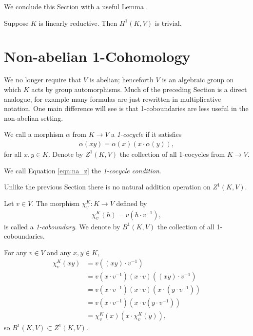 We conclude this Section with a useful Lemma \cite[Proposition 1]{kemper2000characterization}.
\begin{lemma} Suppose $K$ is linearly reductive. Then $H^1(K, V)$ is trivial.
  \label{lem:lin_red_h}
\end{lemma}

\section{Non-abelian 1-Cohomology}
	
We no longer require that $V$ is abelian; henceforth $V$ is an algebraic group on which $K$ acts by group automorphisms. Much of the preceding Section is a direct analogue, for example many formulas are just rewritten in multiplicative notation.
One main difference will see is that 1-coboundaries are less useful in the non-abelian setting.

\begin{definition} We call a morphism $\alpha$ from $K\rightarrow V$ a \emph{1-cocycle} if it satisfies
\begin{align}
  \alpha(xy) = \alpha(x) (x\cdot\alpha(y)),
  \label{eqn:na_z}
\end{align}
for all $x, y \in K$. Denote by $Z^1\left( K, V \right)$ the collection of all 1-cocycles from $K\rightarrow V$.

We call Equation \ref{eqn:na_z} the \emph{1-cocycle condition}.
\end{definition}

\begin{remark} Unlike the previous Section there is no natural addition operation on $Z^1(K, V)$.
\end{remark}

\begin{definition} Let $v \in V$. The morphism $\chi^K_v:K\rightarrow V$ defined by
\begin{align*}
	\chi^K_v (h) = v (h\cdot v^{-1}),
\end{align*}
is called a \emph{1-coboundary}. We denote by $B^1\left(K, V\right)$ the collection of all 1-coboundaries.
\end{definition}

For any $v \in V$ and any $x, y \in K$,
\begin{align*}
	\chi^K_v(xy) &=  v \left((xy) \cdot v^{-1}\right) \\
	&=  v (x \cdot v^{-1}) (x \cdot v) ((xy) \cdot v^{-1}) \\
	&=  v \left(x \cdot v^{-1}\right) (x \cdot v) \left(x \cdot \left(y \cdot v^{-1}\right)\right) \\
	&=  v \left(x \cdot v^{-1}\right) \left(x \cdot v \left(y \cdot v^{-1}\right)\right) \\
	&=  \chi^K_v(x) (x \cdot \chi^K_v(y)),
\end{align*}
so $B^1(K, V) \subset Z^1(K, V)$.

